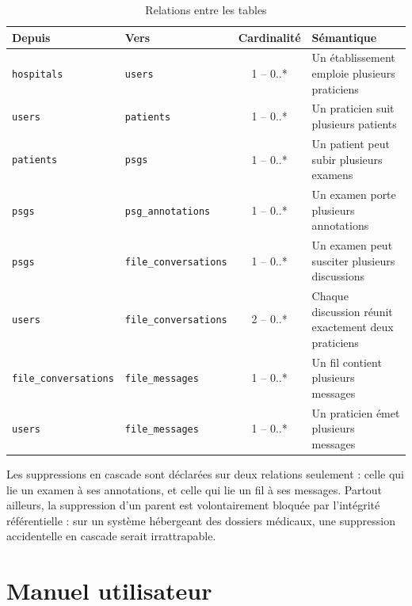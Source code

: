 \begin{table}[H]
\centering
\caption{Relations entre les tables}
\label{tab:ann-relations}
\small
\begin{tabular}{@{}llcL{5.4cm}@{}}
\toprule
\textbf{Depuis} & \textbf{Vers} & \textbf{Cardinalité} & \textbf{Sémantique} \\
\midrule
\texttt{hospitals} & \texttt{users}    & 1 -- 0..* & Un établissement emploie
                                                     plusieurs praticiens \\
\texttt{users}     & \texttt{patients} & 1 -- 0..* & Un praticien suit plusieurs
                                                     patients \\
\texttt{patients}  & \texttt{psgs}     & 1 -- 0..* & Un patient peut subir plusieurs
                                                     examens \\
\texttt{psgs}      & \texttt{psg\_annotations} & 1 -- 0..* & Un examen porte plusieurs
                                                     annotations \\
\texttt{psgs}      & \texttt{file\_conversations} & 1 -- 0..* & Un examen peut susciter
                                                     plusieurs discussions \\
\texttt{users}     & \texttt{file\_conversations} & 2 -- 0..* & Chaque discussion
                                                     réunit exactement deux praticiens \\
\texttt{file\_conversations} & \texttt{file\_messages} & 1 -- 0..* & Un fil contient
                                                     plusieurs messages \\
\texttt{users}     & \texttt{file\_messages} & 1 -- 0..* & Un praticien émet plusieurs
                                                     messages \\
\bottomrule
\end{tabular}
\end{table}

Les suppressions en cascade sont déclarées sur deux relations seulement : celle qui lie
un examen à ses annotations, et celle qui lie un fil à ses messages. Partout ailleurs,
la suppression d'un parent est volontairement bloquée par l'intégrité référentielle :
sur un système hébergeant des dossiers médicaux, une suppression accidentelle en
cascade serait irrattrapable.

\chapter{Manuel utilisateur}
\label{annexe:manuel}

